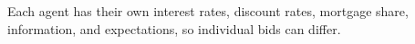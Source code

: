 Each agent has their own interest rates, discount rates, mortgage share, information, and expectations, so individual bids can differ.









